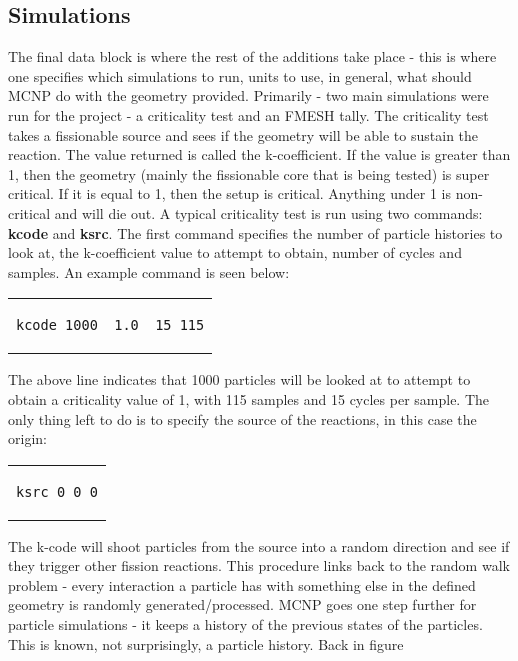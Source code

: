 \subsection{Simulations}
The final data block is where the rest of the additions take place - this is where one specifies which simulations to run, units to use, in general, what should MCNP do with the geometry provided. Primarily - two main simulations were run for the project - a criticality test and an FMESH tally. The criticality test takes a fissionable source and sees if the geometry will be able to sustain the reaction. The value returned is called the k-coefficient. If the value is greater than 1, then the geometry (mainly the fissionable core that is being tested) is super critical. If it is equal to 1, then the setup is critical. Anything under 1 is non-critical and will die out. A typical criticality test is run using two commands: \textbf{kcode} and \textbf{ksrc}. The first command specifies the number of particle histories to look at, the k-coefficient value to attempt to obtain, number of cycles and samples. An example command is seen below:
\begin{center}
\begin{tabular}{c}
\begin{lstlisting}
kcode 1000  1.0  15 115
\end{lstlisting}
\end{tabular}
\end{center}
The above line indicates that 1000 particles will be looked at to attempt to obtain a criticality value of 1, with 115 samples and 15 cycles per sample. The only thing left to do is to specify the source of the reactions, in this case the origin:
\begin{center}
\begin{tabular}{c}
\begin{lstlisting}
ksrc 0 0 0
\end{lstlisting}
\end{tabular}
\end{center}
The k-code will shoot particles from the source into a random direction and see if they trigger other fission reactions. This procedure links back to the random walk problem - every interaction a particle has with something else in the defined geometry is randomly generated/processed. MCNP goes one step further for particle simulations - it keeps a history of the previous states of the particles. This is known, not surprisingly, a particle history. Back in figure %

